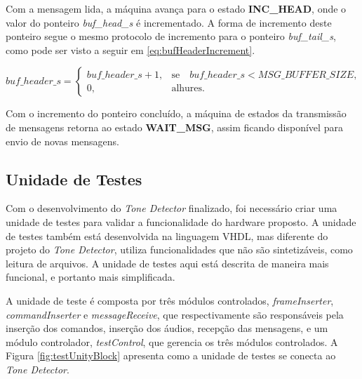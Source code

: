 \documentclass[monografia]{subfiles}
\begin{document}
			Com a mensagem lida, a máquina avança para o estado \textbf{INC\_HEAD}, onde o valor do ponteiro \textit{buf\_head\_s} é incrementado. A forma de
			incremento deste ponteiro segue o mesmo protocolo de incremento para o ponteiro \textit{buf\_tail\_s}, como pode ser visto a seguir em 
			\ref{eq:bufHeaderIncrement}.

				\begin{equation}
					{buf\_header\_s} = \left\{\begin{array}{rl}
					{buf\_header\_s}+1,&\mbox{se}\quad {buf\_header\_s} < {MSG\_BUFFER\_SIZE},\\
					0, &\mbox{alhures.}\quad
				\end{array}\right.
				\label{eq:bufHeaderIncrement}
				\end{equation}

			Com o incremento do ponteiro concluído, a máquina de estados da transmissão de mensagens retorna ao estado \textbf{WAIT\_MSG}, assim ficando 
			disponível para envio de novas mensagens.

			\newpage



	\subsection{Unidade de Testes}
		\label{sec:testUnitySection}
			Com o desenvolvimento do \textit{Tone Detector} finalizado, foi necessário criar uma unidade de testes para validar a funcionalidade do 
			hardware proposto. A unidade de testes também está desenvolvida na linguagem VHDL, mas diferente do projeto do \textit{Tone Detector},
			utiliza funcionalidades que não são sintetizáveis, como leitura de arquivos. A unidade de testes aqui está descrita de maneira mais funcional,
			e portanto mais simplificada.

			A unidade de teste é composta por três módulos controlados, \textit{frameInserter}, \textit{commandInserter} e \textit{messageReceive},
			que respectivamente são responsáveis pela inserção dos comandos, inserção dos áudios, recepção das mensagens, 
			e um módulo controlador, \textit{testControl}, que gerencia os três módulos controlados. A Figura \ref{fig:testUnityBlock} apresenta
			como a unidade de testes se conecta ao \textit{Tone Detector}. 
\end{document}
